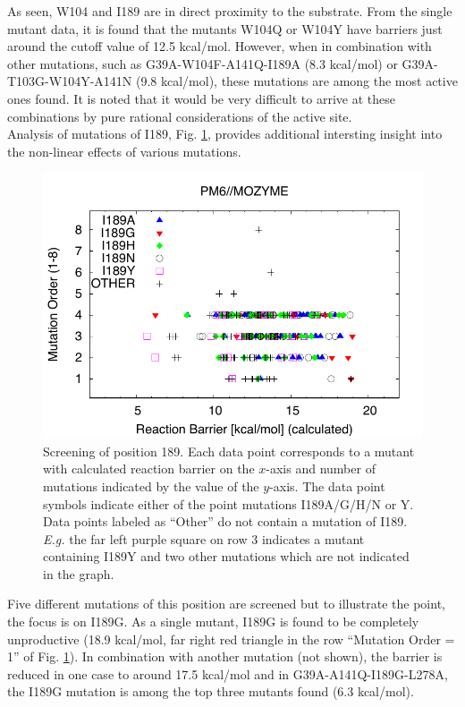 As seen, W104 and I189 are in direct proximity to the substrate.
From the single mutant data, it is found that the mutants W104Q or W104Y have barriers just around the cutoff value of 12.5 kcal/mol.
However, when in combination with other mutations, such as G39A-W104F-A141Q-I189A (8.3 kcal/mol) or G39A-T103G-W104Y-A141N (9.8 kcal/mol), these mutations are among the most active ones found.
It is noted that it would be very difficult to arrive at these combinations by pure rational considerations of the active site.\\
Analysis of mutations of I189, Fig. \ref{fig:i189g}, provides additional intersting insight into the non-linear effects of various mutations.
\begin{figure}[htbp] 
\includegraphics[width=0.95\linewidth]{011-diag_eval_scre_setL-i189.pdf}
\caption{
Screening of position 189.
Each data point corresponds to a mutant with calculated reaction barrier on the $x$-axis and number of mutations indicated by the value of the $y$-axis.
The data point symbols indicate either of the point mutations I189A/G/H/N or Y.
Data points labeled as ``Other'' do not contain a mutation of I189.
\textit{E.g.} the far left purple square on row 3 indicates a mutant containing I189Y and two other mutations which are not indicated in the graph.
}
\label{fig:i189g}
\end{figure}
Five different mutations of this position are screened but to illustrate the point, the focus is on I189G.
As a single mutant, I189G is found to be completely unproductive (18.9 kcal/mol, far right red triangle in the row ``Mutation Order = 1'' of Fig. \ref{fig:i189g}).
In combination with another mutation (not shown), the barrier is reduced in one case to around 17.5 kcal/mol and in G39A-A141Q-I189G-L278A, the I189G mutation is among the top three mutants found (6.3 kcal/mol).

